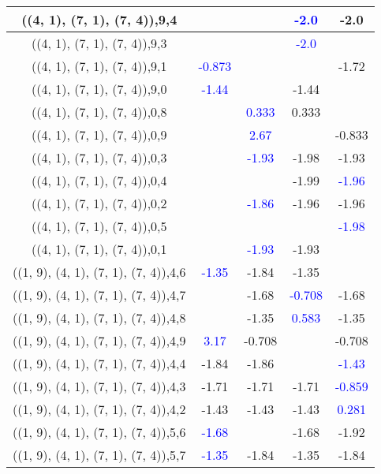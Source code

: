 \documentclass{article}
\begin{document}
\begin{center}
\begin{longtable}{|c|c|c|c|c|}
        	\hline
        	((4, 1), (7, 1), (7, 4)),9,4&&& \textcolor{blue}{-2.0}&-2.0\\
        	\hline
        	((4, 1), (7, 1), (7, 4)),9,3&&& \textcolor{blue}{-2.0}&\\
        	\hline
        	((4, 1), (7, 1), (7, 4)),9,1& \textcolor{blue}{-0.873}&&&-1.72\\
        	\hline
        	((4, 1), (7, 1), (7, 4)),9,0& \textcolor{blue}{-1.44}&&-1.44&\\
        	\hline
        	((4, 1), (7, 1), (7, 4)),0,8&& \textcolor{blue}{0.333}&0.333&\\
        	\hline
        	((4, 1), (7, 1), (7, 4)),0,9&& \textcolor{blue}{2.67}&&-0.833\\
        	\hline
        	((4, 1), (7, 1), (7, 4)),0,3&& \textcolor{blue}{-1.93}&-1.98&-1.93\\
        	\hline
        	((4, 1), (7, 1), (7, 4)),0,4&&&-1.99& \textcolor{blue}{-1.96}\\
        	\hline
        	((4, 1), (7, 1), (7, 4)),0,2&& \textcolor{blue}{-1.86}&-1.96&-1.96\\
        	\hline
        	((4, 1), (7, 1), (7, 4)),0,5&&&& \textcolor{blue}{-1.98}\\
        	\hline
        	((4, 1), (7, 1), (7, 4)),0,1&& \textcolor{blue}{-1.93}&-1.93&\\
        	\hline
        	((1, 9), (4, 1), (7, 1), (7, 4)),4,6& \textcolor{blue}{-1.35}&-1.84&-1.35&\\
        	\hline
        	((1, 9), (4, 1), (7, 1), (7, 4)),4,7&&-1.68& \textcolor{blue}{-0.708}&-1.68\\
        	\hline
        	((1, 9), (4, 1), (7, 1), (7, 4)),4,8&&-1.35& \textcolor{blue}{0.583}&-1.35\\
        	\hline
        	((1, 9), (4, 1), (7, 1), (7, 4)),4,9& \textcolor{blue}{3.17}&-0.708&&-0.708\\
        	\hline
        	((1, 9), (4, 1), (7, 1), (7, 4)),4,4&-1.84&-1.86&& \textcolor{blue}{-1.43}\\
        	\hline
        	((1, 9), (4, 1), (7, 1), (7, 4)),4,3&-1.71&-1.71&-1.71& \textcolor{blue}{-0.859}\\
        	\hline
        	((1, 9), (4, 1), (7, 1), (7, 4)),4,2&-1.43&-1.43&-1.43& \textcolor{blue}{0.281}\\
        	\hline
        	((1, 9), (4, 1), (7, 1), (7, 4)),5,6& \textcolor{blue}{-1.68}&&-1.68&-1.92\\
        	\hline
        	((1, 9), (4, 1), (7, 1), (7, 4)),5,7& \textcolor{blue}{-1.35}&-1.84&-1.35&-1.84\\

\end{longtable}
\end{center}
\end{document}
